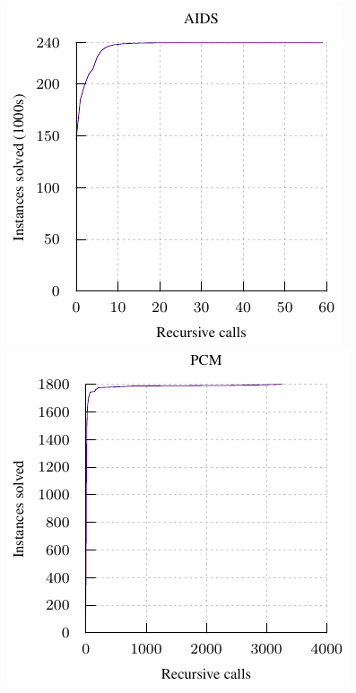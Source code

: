 \documentclass[twoside,11pt]{article}
\begin{document}
\begin{figure}[t]
    \centering
    \hspace*{1em}
    \includegraphics*{plots/biiiig-data-aids.pdf}
    \hfill
    \includegraphics*{plots/biiiig-data-pcms.pdf}
    \hspace*{1em}

    \vspace*{1em}


\end{figure}
\end{document}
